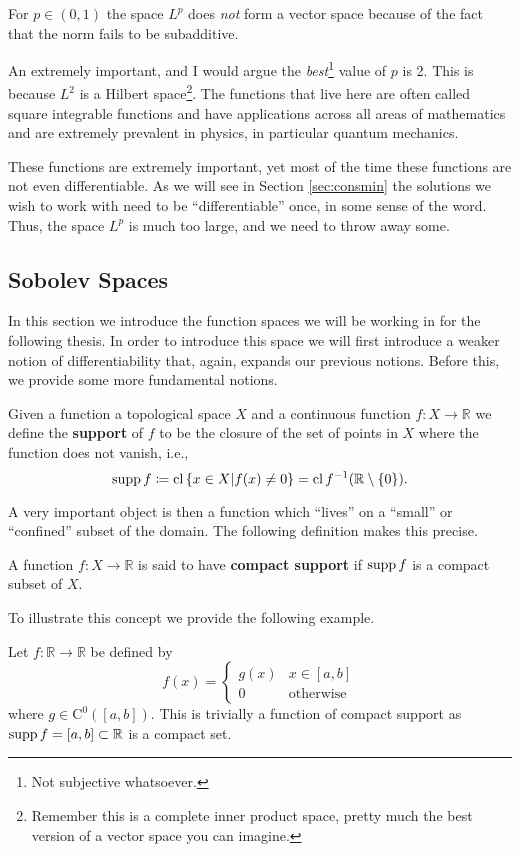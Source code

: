 \begin{remark}
For $p\in(0,1)$ the space $L^p$ does \textit{not} form a vector space because of the fact that the norm fails to be subadditive.
\end{remark}

An extremely important, and I would argue the \textit{best}\footnote{Not subjective whatsoever.} value of $p$ is 2. This is because $L^2$ is a Hilbert space\footnote{Remember this is a complete inner product space, pretty much the best version of a vector space you can imagine.}. The functions that live here are often called square integrable functions and have applications across all areas of mathematics and are extremely prevalent in physics, in particular quantum mechanics.

These functions are extremely important, yet most of the time these functions are not even differentiable. As we will see in Section \ref{sec:consmin} the solutions we wish to work with need to be ``differentiable'' once, in some sense of the word. Thus, the space $L^p$ is much too large, and we need to throw away some.

\subsection{Sobolev Spaces}\label{subsec:weakds}
In this section we introduce the function spaces we will be working in for the following thesis. In order to introduce this space we will first introduce a weaker notion of differentiability that, again, expands our previous notions. Before this, we provide some more fundamental notions.
\begin{definition}
Given a function a topological space $X$ and a continuous function $f:X\to\mathbb{R}$ we define the \textbf{support} of $f$ to be the closure of the set of points in $X$ where the function does not vanish, i.e.,
\begin{equation}
\operatorname{supp}{f}\coloneqq \operatorname{cl}{\{x\in X | f(x) \neq 0\}} = \operatorname{cl}{f^{-1}(\mathbb{R}\setminus\{0\})}.
\end{equation}
\end{definition}
A very important object is then a function which ``lives'' on a ``small'' or ``confined'' subset of the domain. The following definition makes this precise.
\begin{definition}
A function $f:X\to\mathbb{R}$ is said to have \textbf{compact support} if $\operatorname{supp}{f}$ is a compact subset of $X$.
\end{definition}
To illustrate this concept we provide the following example.
\begin{example}
Let $f:\mathbb{R}\to\mathbb{R}$ be defined by
\begin{equation}
f(x) = \begin{cases}
g(x) & x\in[a,b] \\
0 & \text{otherwise}
\end{cases}
\end{equation}
where $g\in\mathrm{C}^0([a,b])$. This is trivially a function of compact support as $\operatorname{supp}{f} = [a,b]\subset\mathbb{R}$ is a compact set.
\end{example}

